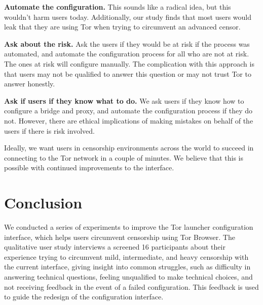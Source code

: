 \documentclass[USenglish,oneside,twocolumn]{article}
\begin{document}
\begin{description}
\item{\bfseries Automate the configuration.} This sounds like a radical idea, but this wouldn't harm users today. Additionally, our study finds that most users would leak that they are using Tor when trying to circumvent an advanced censor. 
\item{\bfseries Ask about the risk.} Ask the users if they would be at risk if the process was automated, and automate the configuration process for all who are not at risk. The ones at risk will configure manually. The complication with this approach is that users may not be qualified to answer this question or may not trust Tor to answer honestly. 
\item{\bfseries Ask if users if they know what to do.} We ask users if they know how to configure a bridge and proxy, and automate the configuration process if they do not. However, there are ethical implications of making mistakes on behalf of the users if there is risk involved. 
\end{description}

Ideally, we want users in censorship environments across the world to succeed in connecting to the Tor network in a couple of minutes. We believe that this is possible with continued improvements to the interface. 


\section{Conclusion} 
We conducted a series of experiments to improve the Tor launcher configuration interface, which helps users circumvent censorship using Tor Browser. The qualitative user study interviews a screened 16 participants about their experience trying to circumvent mild, intermediate, and heavy censorship with the current interface, giving insight into common struggles, such as difficulty in answering technical questions, feeling unqualified to make technical choices, and not receiving feedback in the event of a failed configuration. This feedback is used to guide the redesign of the configuration interface. 
\end{document}
